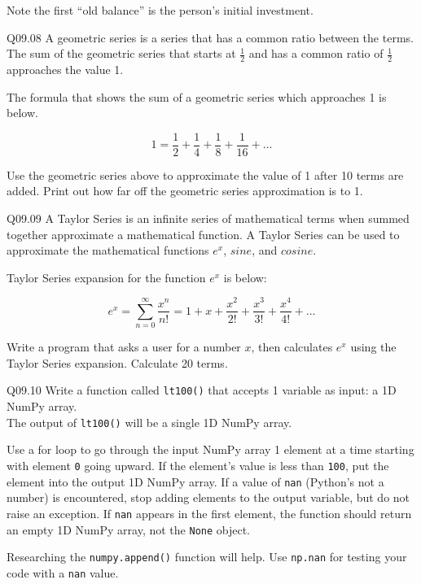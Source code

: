 \documentclass{book}
\newenvironment{problems}{}{}  %
\newcommand{\passthrough}[1]{#1}
\begin{document}
\begin{problems}
Note the first ``old balance'' is the person's initial investment.

Q09.08 A geometric series is a series that has a common ratio between
the terms. The sum of the geometric series that starts at
\(\frac{1}{2}\) and has a common ratio of \(\frac{1}{2}\) approaches the
value 1.

The formula that shows the sum of a geometric series which approaches 1
is below.

\[ 1 = \frac{1}{2} + \frac{1}{4} + \frac{1}{8} + \frac{1}{16} + ... \]

Use the geometric series above to approximate the value of 1 after 10
terms are added. Print out how far off the geometric series
approximation is to 1.

Q09.09 A Taylor Series is an infinite series of mathematical terms when
summed together approximate a mathematical function. A Taylor Series can
be used to approximate the mathematical functions \(e^x\), \(sine\), and
\(cosine\).

Taylor Series expansion for the function \(e^x\) is below:

\[  {e^x} = \sum\limits_{n = 0}^\infty  {\frac{{{x^n}}}{{n!}}}  = 1 + x + \frac{{{x^2}}}{{2!}} + \frac{{{x^3}}}{{3!}} + \frac{{{x^4}}}{{4!}} + ... \]

Write a program that asks a user for a number \(x\), then calculates
\(e^x\) using the Taylor Series expansion. Calculate 20 terms.

Q09.10 Write a function called \passthrough{\lstinline!lt100()!} that
accepts 1 variable as input: a 1D NumPy array.\\
The output of \passthrough{\lstinline!lt100()!} will be a single 1D
NumPy array.

Use a for loop to go through the input NumPy array 1 element at a time
starting with element \passthrough{\lstinline!0!} going upward. If the
element's value is less than \passthrough{\lstinline!100!}, put the
element into the output 1D NumPy array. If a value of
\passthrough{\lstinline!nan!} (Python's not a number) is encountered,
stop adding elements to the output variable, but do not raise an
exception. If \passthrough{\lstinline!nan!} appears in the first
element, the function should return an empty 1D NumPy array, not the
\passthrough{\lstinline!None!} object.

Researching the \passthrough{\lstinline!numpy.append()!} function will
help. Use \passthrough{\lstinline!np.nan!} for testing your code with a
\passthrough{\lstinline!nan!} value.


\end{problems}
\end{document}
